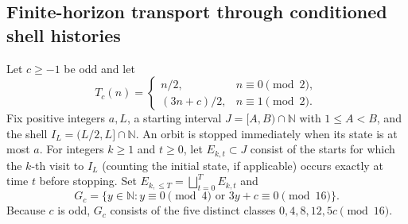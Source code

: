 \subsection{Finite-horizon transport through conditioned shell histories}
\label{subsec:finite-horizon-transport}
Let $c\ge-1$ be odd and let
\[
 T_c(n)=\begin{cases}n/2,&n\equiv0\pmod2,\\(3n+c)/2,&n\equiv1\pmod2.\end{cases}
\]
Fix positive integers $a,L$, a starting interval $J=[A,B)\cap\mathbb N$
with $1\le A<B$, and the shell $I_L=(L/2,L]\cap\mathbb N$.
An orbit is stopped immediately when its state is at most $a$.
For integers $k\ge1$ and $t\ge0$, let $E_{k,t}\subset J$ consist
of the starts for which the $k$-th visit to $I_L$ (counting the
initial state, if applicable) occurs exactly at time $t$ before stopping.
Set $E_{k,\le T}=\bigsqcup_{t=0}^T E_{k,t}$ and
\[
 G_c=\{y\in\mathbb N:y\equiv0\pmod4\text{ or }
 3y+c\equiv0\pmod{16}\}.
\]
Because $c$ is odd, $G_c$ consists of the five distinct classes
$0,4,8,12,5c\pmod{16}$.

